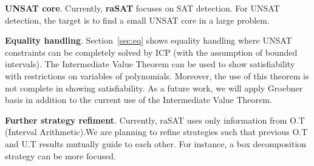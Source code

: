\documentclass[runningheads,a4paper,oribibl]{llncs}
\begin{document}
\medskip \noindent 
{\bf UNSAT core}. Currently, \textbf{raSAT} focuses on SAT detection. For
UNSAT detection, the target is to find a small UNSAT core in a large problem.


\medskip \noindent 
{\bf Equality handling}. 
Section~\ref{sec:eq} shows equality handling where UNSAT constraints can be completely solved by ICP (with the assumption of bounded intervals). The Intermediate Value Theorem can be used to show satisfiability with restrictions on variables of polynomials. Moreover, the use of this theorem is not complete in showing satisfiability. As a future work, we will apply Groebner basis in addition to the current use of the Intermediate Value Theorem.

\medskip \noindent 
{\bf Further strategy refiment}. 
Currently, raSAT uses only information from
O.T (Interval Arithmetic).We are planning to refine strategies such that previous
O.T and U.T results mutually guide to each other. For instance, a box decomposition strategy can be more focused.
\end{document}
